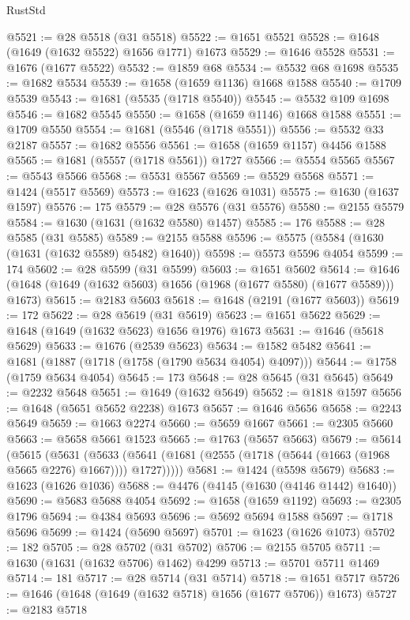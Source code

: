 \begin{lexlean}{RustStd}
\begin{coremodule}
@5521 := @28 @5518 (@31 @5518)
@5522 := @1651 @5521
@5528 := @1648 (@1649 (@1632 @5522) @1656 @1771) @1673
@5529 := @1646 @5528
@5531 := @1676 (@1677 @5522)
@5532 := @1859 @68
@5534 := @5532 @68 @1698
@5535 := @1682 @5534
@5539 := @1658 (@1659 @1136) @1668 @1588
@5540 := @1709 @5539
@5543 := @1681 (@5535 (@1718 @5540))
@5545 := @5532 @109 @1698
@5546 := @1682 @5545
@5550 := @1658 (@1659 @1146) @1668 @1588
@5551 := @1709 @5550
@5554 := @1681 (@5546 (@1718 @5551))
@5556 := @5532 @33 @2187
@5557 := @1682 @5556
@5561 := @1658 (@1659 @1157) @4456 @1588
@5565 := @1681 (@5557 (@1718 @5561)) @1727
@5566 := @5554 @5565
@5567 := @5543 @5566
@5568 := @5531 @5567
@5569 := @5529 @5568
@5571 := @1424 (@5517 @5569)
@5573 := @1623 (@1626 @1031)
@5575 := @1630 (@1637 @1597)
@5576 := 175
@5579 := @28 @5576 (@31 @5576)
@5580 := @2155 @5579
@5584 := @1630 (@1631 (@1632 @5580) @1457)
@5585 := 176
@5588 := @28 @5585 (@31 @5585)
@5589 := @2155 @5588
@5596 := @5575 (@5584 (@1630 (@1631 (@1632 @5589) @5482) @1640))
@5598 := @5573 @5596 @4054
@5599 := 174
@5602 := @28 @5599 (@31 @5599)
@5603 := @1651 @5602
@5614 := @1646 (@1648 (@1649 (@1632 @5603) @1656 (@1968 (@1677 @5580) (@1677 @5589))) @1673)
@5615 := @2183 @5603
@5618 := @1648 (@2191 (@1677 @5603))
@5619 := 172
@5622 := @28 @5619 (@31 @5619)
@5623 := @1651 @5622
@5629 := @1648 (@1649 (@1632 @5623) @1656 @1976) @1673
@5631 := @1646 (@5618 @5629)
@5633 := @1676 (@2539 @5623)
@5634 := @1582 @5482
@5641 := @1681 (@1887 (@1718 (@1758 (@1790 @5634 @4054) @4097)))
@5644 := @1758 (@1759 @5634 @4054)
@5645 := 173
@5648 := @28 @5645 (@31 @5645)
@5649 := @2232 @5648
@5651 := @1649 (@1632 @5649)
@5652 := @1818 @1597
@5656 := @1648 (@5651 @5652 @2238) @1673
@5657 := @1646 @5656
@5658 := @2243 @5649
@5659 := @1663 @2274
@5660 := @5659 @1667
@5661 := @2305 @5660
@5663 := @5658 @5661 @1523
@5665 := @1763 (@5657 @5663)
@5679 := @5614
    (@5615
      (@5631
        (@5633 (@5641 (@1681 (@2555 (@1718 (@5644 (@1663 (@1968 @5665 @2276) @1667)))) @1727)))))
@5681 := @1424 (@5598 @5679)
@5683 := @1623 (@1626 @1036)
@5688 := @4476 (@4145 (@1630 (@4146 @1442) @1640))
@5690 := @5683 @5688 @4054
@5692 := @1658 (@1659 @1192)
@5693 := @2305 @1796
@5694 := @4384 @5693
@5696 := @5692 @5694 @1588
@5697 := @1718 @5696
@5699 := @1424 (@5690 @5697)
@5701 := @1623 (@1626 @1073)
@5702 := 182
@5705 := @28 @5702 (@31 @5702)
@5706 := @2155 @5705
@5711 := @1630 (@1631 (@1632 @5706) @1462) @4299
@5713 := @5701 @5711 @1469
@5714 := 181
@5717 := @28 @5714 (@31 @5714)
@5718 := @1651 @5717
@5726 := @1646 (@1648 (@1649 (@1632 @5718) @1656 (@1677 @5706)) @1673)
@5727 := @2183 @5718

\end{coremodule}
\end{lexlean}
